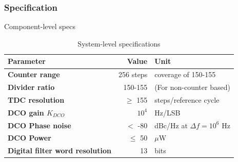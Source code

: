 \documentclass[t, screen, aspectratio=43]{beamer}
\begin{document}
\begin{frame}
	\frametitle{Specification\color{black}}
	\begin{block}{Component-level specs}
		\scriptsize
	\begin{table}[h!]
		\centering
		\def\arraystretch{1.5}		
		\setlength\arrayrulewidth{0.75pt}
		\setlength{\tabcolsep}{1em} %
		\begin{tabular}{|l|r|l|}
			\hline 
			\rule[-1ex]{0pt}{2.5ex} \cellcolor{gray!40}\textbf{Parameter} & \cellcolor{gray!40}\textbf{Value} & \cellcolor{gray!40}\textbf{Unit }\\ 
			\hline 
			\rule[-1ex]{0pt}{2.5ex} \textbf{Counter range}  & 256 steps & coverage of 150-155 \\ 
			\hline 
			\rule[-1ex]{0pt}{2.5ex} \textbf{Divider ratio} & 150-155  & (For non-counter based)\\ 
			\hline 
			\rule[-1ex]{0pt}{2.5ex} \textbf{TDC resolution} &$\geq$ 155  & steps/reference cycle\\ 
			\hline 
			\rule[-1ex]{0pt}{2.5ex} \textbf{DCO gain $K_{DCO}$} & $10^4$ & Hz/LSB \\ 
			\hline 
			\rule[-1ex]{0pt}{2.5ex} \textbf{DCO Phase noise} &$<$ -80 & dBc/Hz at $\Delta f=10^6$ Hz \\ 
			\hline 
			\rule[-1ex]{0pt}{2.5ex} \textbf{DCO Power} & $\leq$ 50 & $\mu$W \\ 
			\hline 
			\rule[-1ex]{0pt}{2.5ex} \textbf{Digital filter word resolution} & 13 & bits \\ 
			\hline 
		\end{tabular} 
		\caption{System-level specifications}
		\label{design_specs}
	\end{table}   
	\end{block}    
\end{frame}




\end{document}
